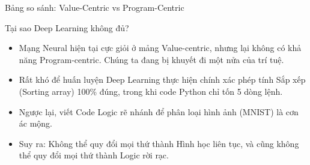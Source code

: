 \documentclass[aspectratio=169]{beamer}
\begin{document}
\begin{frame}{Bảng so sánh: Value-Centric vs Program-Centric}
    \begin{table}[]
        \centering
        \caption{Sự khác biệt giữa hai thái cực trừu tượng}
    \end{table}
\end{frame}

\begin{frame}{Tại sao Deep Learning không đủ?}
    \begin{itemize}
        \item Mạng Neural hiện tại cực giỏi ở mảng Value-centric, nhưng lại không có khả năng Program-centric. Chúng ta đang bị khuyết đi một nửa của trí tuệ.
        \item Rất khó để huấn luyện Deep Learning thực hiện chính xác phép tính Sắp xếp (Sorting array) 100\% đúng, trong khi code Python chỉ tốn 5 dòng lệnh.
        \item Ngược lại, viết Code Logic rẽ nhánh để phân loại hình ảnh (MNIST) là cơn ác mộng.
        \item Suy ra: Không thể quy đổi mọi thứ thành Hình học liên tục, và cũng không thể quy đổi mọi thứ thành Logic rời rạc.
    \end{itemize}
\end{frame}
\end{document}

